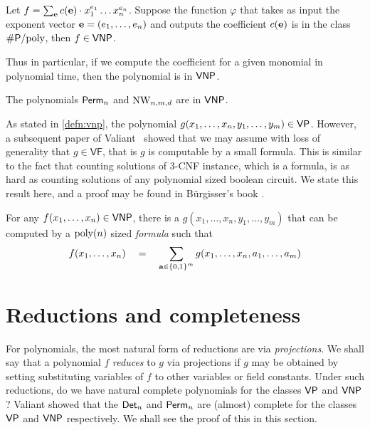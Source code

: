 \begin{theorem} \label{thm:val-criterion}
Let $f = \sum_{\mathbf{e}} c(\mathbf{e}) \cdot x_1^{e_1}\dots x_n^{e_n}$. Suppose the function $\varphi$ that takes as input the exponent vector $\mathbf{e} = (e_1,\dots, e_n)$ and outputs the coefficient $c(\mathbf{e})$ is in the class $\#\mathsf{P}/\mathrm{poly}$, then $f \in \mathsf{VNP}$. 
\end{theorem}

Thus in particular, if we compute the coefficient for a given monomial in polynomial time, then the polynomial is in $\mathsf{VNP}$. 

\begin{corollary}
The polynomials $\mathsf{Perm}_n$ and $\mathrm{NW}_{n,m,d}$ are in $\mathsf{VNP}$. 
\end{corollary}

As stated in \autoref{defn:vnp}, the polynomial $g(x_1,\dots, x_n, y_1,\dots, y_m) \in \mathsf{VP}$. However, a subsequent paper of Valiant~\cite{v82} showed that we may assume with loss of generality that $g \in \mathsf{VF}$, that is $g$ is computable by a small formula. This is similar to the fact that counting solutions of 3-\textsf{CNF} instance, which is a formula, is as hard as counting solutions of any polynomial sized boolean circuit. We state this result here, and a proof may be found in B\"urgisser's book \cite{bur00}. 

\begin{theorem}\label{thm:vnp-formula}
For any $f(x_1,\dots, x_n)\in \mathsf{VNP}$, there is a $g(x_1,\dots, x_n, y_1,\dots, y_m)$ that can be computed by a $\mathrm{poly}(n)$ sized \emph{formula} such that 
\[
f(x_1,\dots, x_n)\quad = \quad \sum_{\mathbf{a} \in \left\{0,1\right\}^m} g(x_1,\dots, x_n, a_1,\dots, a_m)
\]
\end{theorem}

\section{Reductions and completeness}

For polynomials, the most natural form of reductions are via \emph{projections}. We shall say that a polynomial $f$ \emph{reduces} to $g$ via projections if $g$ may be obtained by setting substituting variables of $f$ to other variables or field constants. Under such reductions, do we have natural complete polynomials for the classes $\mathsf{VP}$ and $\mathsf{VNP}$? Valiant \cite{v79} showed that the $\mathsf{Det}_n$ and $\mathsf{Perm}_n$ are (almost) complete for the classes $\mathsf{VP}$ and $\mathsf{VNP}$ respectively. We shall see the proof of this in this section. 

